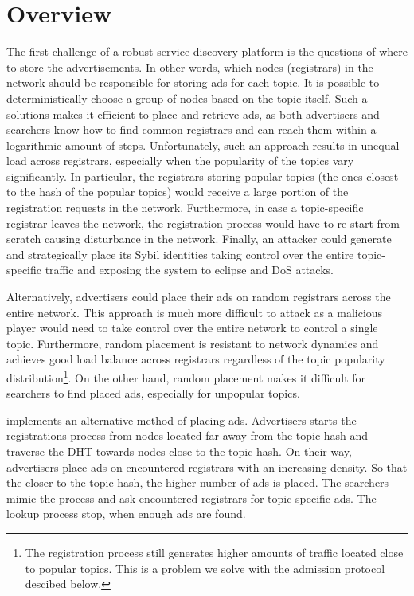 \section{Overview}
\label{sec:overview}
 The first challenge of a robust service discovery platform is the questions of where to store the advertisements. In other words, which nodes (registrars) in the network should be responsible for storing ads for each topic. It is possible to deterministically choose a group of nodes based on the topic itself. Such a solutions makes it efficient to place and retrieve ads, as both advertisers and searchers know how to find common registrars and can reach them within a logarithmic amount of steps. Unfortunately, such an approach results in unequal load across registrars, especially when the popularity of the topics vary significantly. In particular, the registrars storing popular topics (\ie the ones closest to the hash of the popular topics) would receive a large portion of the registration requests in the network. Furthermore,  in case a topic-specific registrar leaves the network, the registration process would have to re-start from scratch causing disturbance in the network. Finally, an attacker could generate and strategically place its Sybil identities taking control over the entire topic-specific traffic and exposing the system to eclipse and DoS attacks. 

Alternatively,  advertisers could place their ads on random registrars across the entire network. This approach is much more difficult to attack as a malicious player would need to take control over the entire network to control a single topic. Furthermore, random placement is resistant to network dynamics and achieves good load balance across registrars regardless of the topic popularity distribution\footnote{The registration process still generates higher amounts of traffic located close to popular topics. This is a problem we solve with the admission protocol descibed below.}. On the other hand, random placement makes it difficult for searchers to find placed ads, especially for unpopular topics. 

\sysname implements an alternative method of placing ads. Advertisers starts the registrations process from nodes located far away from the topic hash and traverse the DHT towards nodes close to the topic hash. On their way, advertisers place ads on encountered registrars with an increasing density. So that the closer to the topic hash, the higher number of ads is placed. The searchers mimic the process and ask encountered registrars for topic-specific ads. The lookup process stop, when enough ads are found. 

